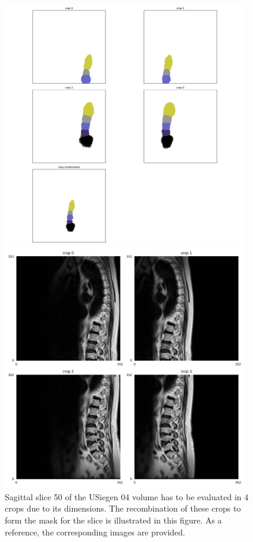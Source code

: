 \begin{figure}
\begin{minipage}{.99\textwidth}
    \includegraphics[width=0.95\textwidth]{images/USiegen_004_50_crops.pdf}
\end{minipage}
\begin{minipage}{.99\textwidth}
    \includegraphics[width=0.95\textwidth]{images/cropping_slice050.pdf}
\end{minipage}
    \caption{Sagittal slice 50 of the USiegen 04 volume has to be evaluated in 4 crops due to its dimensions. The recombination of these crops to form the mask for the slice is illustrated in this figure. As a reference, the corresponding images are provided.}
\end{figure}

